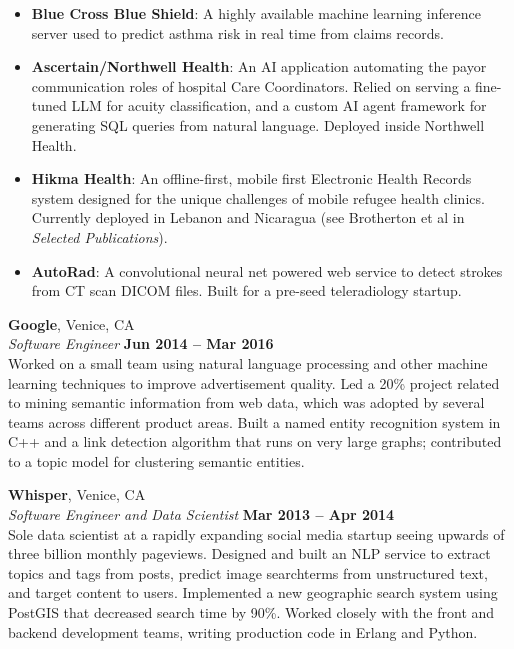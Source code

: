 \documentclass[margin,line]{resume}
\begin{document}
\begin{resume}
    \begin{itemize}
    \item \textbf{Blue Cross Blue Shield}: A highly available machine learning
      inference server used to predict asthma risk in real time from claims
      records.
    \item \textbf{Ascertain/Northwell Health}: An AI application automating the
      payor communication roles of hospital Care Coordinators. Relied on serving
      a fine-tuned LLM for acuity classification, and a custom AI agent
      framework for generating SQL queries from natural language. Deployed
      inside Northwell Health.
    \item \textbf{Hikma Health}: An offline-first, mobile first Electronic
      Health Records system designed for the unique challenges of mobile refugee
      health clinics. Currently deployed in Lebanon and Nicaragua (see
      Brotherton et al in \emph{Selected Publications}).
    \item \textbf{AutoRad}: A convolutional neural net powered web service to
      detect strokes from CT scan DICOM files. Built for a pre-seed
      teleradiology startup.

    \end{itemize}

    \pagebreak

    \textbf{Google}, Venice, CA \vspace{2mm}\\\vspace{1mm}%
    \textsl{Software Engineer} \hfill \textbf{Jun 2014 -- Mar 2016}\\
    Worked on a small team using natural language processing and other machine
    learning techniques to improve advertisement quality. Led a 20\% project
    related to mining semantic information from web data, which was adopted by
    several teams across different product areas. Built a named entity
    recognition system in C++ and a link detection algorithm that runs on very
    large graphs; contributed to a topic model for clustering semantic entities.

    \textbf{Whisper}, Venice, CA \vspace{2mm}\\\vspace{1mm}%
    \textsl{Software Engineer and Data Scientist} \hfill \textbf{Mar 2013 -- Apr 2014}\\
    Sole data scientist at a rapidly expanding social media startup
    seeing upwards of three billion monthly pageviews. Designed and built an NLP
    service to extract topics and tags from posts, predict image searchterms
    from unstructured text, and target content to users. Implemented a new
    geographic search system using PostGIS that decreased search time by
    90\%. Worked closely with the front and backend development teams, writing
    production code in Erlang and Python.


\end{resume}
\end{document}
